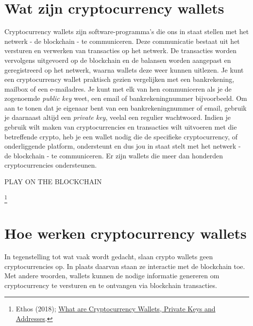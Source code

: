 \section{Wat zijn cryptocurrency wallets}
Cryptocurrency wallets zijn software-programma's die ons in staat stellen met het netwerk - de blockchain - te communiceren. Deze communicatie bestaat uit het versturen en verwerken van transacties op het netwerk. De transacties worden vervolgens uitgevoerd op de blockchain en de balansen worden aangepast en geregistreerd op het netwerk, waarna wallets deze weer kunnen uitlezen. Je kunt een cryptocurrency wallet praktisch gezien vergelijken met een bankrekening, mailbox of een e-mailadres. Je kunt met elk van hen communiceren als je de zogenoemde \emph{public key} weet, een email of bankrekeningnummer bijvoorbeeld. Om aan te tonen dat je eigenaar bent van een bankrekeningnummer of email, gebruik je daarnaast altijd een \emph{private key}, veelal een regulier wachtwoord. Indien je gebruik wilt maken van cryptocurrencies en transacties wilt uitvoeren met die betreffende crypto, heb je een wallet nodig die de specifieke cryptocurrency, of onderliggende platform, ondersteunt en dus jou in staat stelt met het netwerk - de blockchain - te communiceren. Er zijn wallets die meer dan honderden cryptocurrencies ondersteunen.\medskip 

\begin{cryptobox}{PLAY ON THE BLOCKCHAIN}

     \footnote{Ethos (2018); \href{https://www.ethos.io/what-are-cryptocurrency-wallet-private-keys-addresses/}{What are Cryptocurrency Wallets, Private Keys and Addresses}.}
    
\end{cryptobox}

\section{Hoe werken cryptocurrency wallets}
In tegenstelling tot wat vaak wordt gedacht, slaan crypto wallets geen cryptocurrencies op. In plaats daarvan staan ze interactie met de blockchain toe. Met andere woorden, wallets kunnen de nodige informatie genereren om cryptocurrency te versturen en te ontvangen via blockchain transacties.

